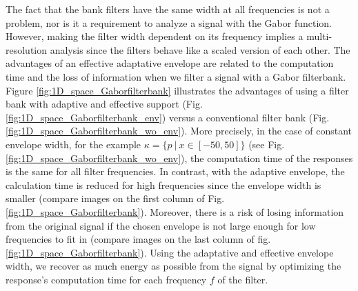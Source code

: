 \documentclass[journal]{IEEEtran}
\begin{document}
The fact that the bank filters have the same width at all frequencies is not a problem, nor is it a requirement to analyze a signal with the Gabor function. However, making the filter width dependent on its frequency implies a multi-resolution analysis since the filters behave like a scaled version of each other. The advantages of an effective adaptative envelope are related to the computation time and the loss of information when we filter a signal with a Gabor filterbank. Figure \ref{fig:1D_space_Gaborfilterbank} illustrates the advantages of using a filter bank with adaptive and effective support (Fig. \ref{fig:1D_space_Gaborfilterbank_env}) versus a conventional filter bank (Fig. \ref{fig:1D_space_Gaborfilterbank_wo_env}). More precisely, in the case of constant envelope width, for the example $\kappa = \lbrace p ~|~ x \in [-50, 50] \rbrace$ (see Fig. \ref{fig:1D_space_Gaborfilterbank_wo_env}), the computation time of the responses is the same for all filter frequencies. In contrast, with the adaptive envelope, the calculation time is reduced for high frequencies since the envelope width is smaller (compare images on the first column of Fig. \ref{fig:1D_space_Gaborfilterbank}). Moreover, there is a risk of losing information from the original signal if the chosen envelope is not large enough for low frequencies to fit in (compare images on the last column of fig. \ref{fig:1D_space_Gaborfilterbank}). Using the adaptative and effective envelope width, we recover as much energy as possible from the signal by optimizing the response's computation time for each frequency $f$ of the filter.
\end{document}
